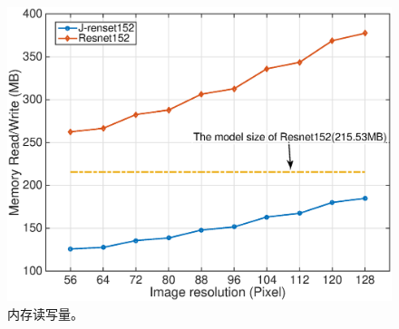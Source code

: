 \begin{figure}[h]
	\centering
	\includegraphics[width=1\textwidth]{figures/mem_WR.eps}
	\caption{内存读写量。}
	\label{memWR}
\end{figure}


%
%			
%

